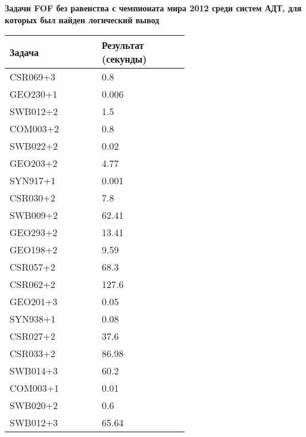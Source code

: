 \textbf{Задачи FOF без равенства с чемпионата мира 2012 среди систем АДТ, для которых был найден логический вывод}

\begin{longtable}[H]{|p{0.3\linewidth}|p{0.3\linewidth}|}
\hline
\textbf{Задача} & \textbf{Результат (секунды)} \\
\hline
CSR069+3 & 0.8  \\
\hline
GEO230+1 & 0.006  \\
\hline
SWB012+2 & 1.5  \\
\hline
COM003+2 & 0.8 \\
\hline
SWB022+2 & 0.02 \\
\hline
GEO203+2 & 4.77 \\
\hline
SYN917+1 & 0.001 \\
\hline
CSR030+2 & 7.8 \\
\hline
SWB009+2 & 62.41 \\
\hline
GEO293+2 & 13.41 \\
\hline
GEO198+2 & 9.59 \\
\hline
CSR057+2 & 68.3 \\
\hline
CSR062+2 & 127.6 \\
\hline
GEO201+3 & 0.05 \\
\hline
SYN938+1 & 0.08 \\
\hline
CSR027+2 & 37.6 \\
\hline
CSR033+2 & 86.98 \\
\hline
SWB014+3 & 60.2 \\
\hline
COM003+1 & 0.01 \\
\hline
SWB020+2 & 0.6 \\
\hline
SWB012+3 & 65.64 \\
\hline
\end{longtable}



